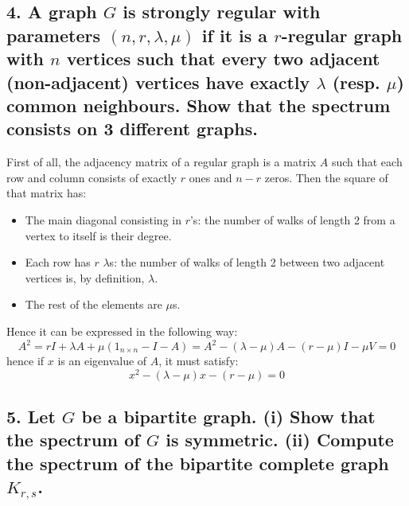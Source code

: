 \subsection[Spectra - 4]{4. A graph $G$ is strongly regular with parameters $(n, r, \lambda, \mu)$ if it is a $r$-regular graph with $n$ vertices such that every two adjacent (non-adjacent) vertices have exactly $\lambda$ (resp. $\mu$) common neighbours. Show that the spectrum consists on 3 different graphs.}

First of all, the adjacency matrix of a regular graph is a matrix $A$ such that each row and column consists of exactly $r$ ones and $n-r$ zeros.
Then the square of that matrix has:
\begin{itemize}
    \item The main diagonal consisting in $r$'s: the number of walks of length 2 from a vertex to itself is their degree.
    \item Each row has $r$ $\lambda$s: the number of walks of length 2 between two adjacent vertices is, by definition, $\lambda$.
    \item The rest of the elements are $\mu$s.
\end{itemize}
Hence it can be expressed in the following way:
$$A^2 = rI + \lambda A + \mu(1_{n \times n} - I - A) = A^2 - (\lambda - \mu)A - (r - \mu)I - \mu V = 0$$
hence if $x$ is an eigenvalue of $A$, it must satisfy:
$$x^2 - (\lambda - \mu)x - (r - \mu) = 0$$

\subsection[Spectra - 5]{5. Let $G$ be a bipartite graph. (i) Show that the spectrum of $G$ is symmetric. (ii) Compute the spectrum of the bipartite complete graph $K_{r,s}$.}
